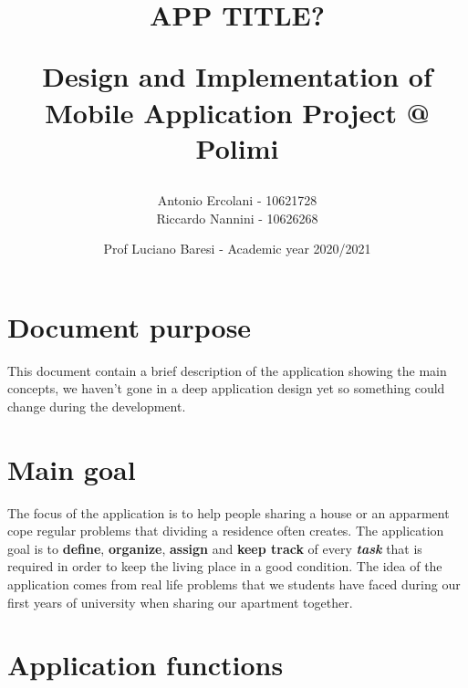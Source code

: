 \documentclass[]{article}
\title{ APP TITLE? \\
	\begin{large} 
		Design and Implementation of Mobile Application Project @ Polimi
	\end{large}}
\author{Antonio Ercolani - 10621728\\Riccardo Nannini - 10626268}
\date{Prof Luciano Baresi - Academic year 2020/2021}
\begin{document}
	
	\maketitle
	
	\begin{paragraph}
		\newline
	\end{paragraph}
	
	\tableofcontents
	
	
	\section{Document purpose}
	This document contain a brief description of the application showing the main concepts, we haven't gone in a deep application design yet so something could change during the development.
	
	\section{Main goal}
	
	The focus of the application is to help people sharing a house or an apparment cope regular problems that dividing a residence often creates. \newline The application goal is to \textbf{define}, \textbf{organize}, \textbf{assign} and \textbf{keep track} of every \textit{\textbf{task}} that is required in order to keep the living place in a good condition. \newline The idea of the application comes from real life problems that we students have faced during our first years of university when sharing our apartment together.
	
	\section{Application functions}
	
\end{document}
